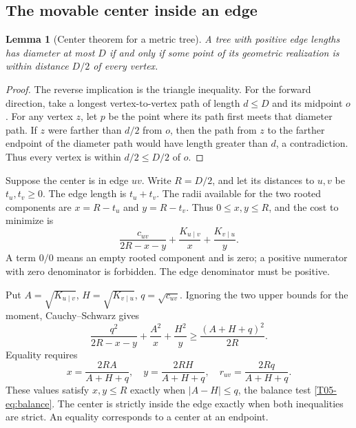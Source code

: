 \documentclass[11pt,a4paper]{article}
\newtheorem{lemma}[theorem]{Lemma}
\theoremstyle{definition}\newtheorem{definition}[theorem]{Definition}
\theoremstyle{remark}\newtheorem{remark}[theorem]{Remark}
\numberwithin{equation}{section}
\begin{document}
\subsection{The movable center inside an edge}\label{T05-sec-3}
\begin{lemma}[Center theorem for a metric tree]\label{T05-lem:center}
A tree with positive edge lengths has diameter at most $D$ if and only if some point of its geometric realization is within distance $D/2$ of every vertex.
\end{lemma}
\begin{proof}
The reverse implication is the triangle inequality. For the forward direction, take a longest vertex-to-vertex path of length $d\le D$ and its midpoint $o$. For any vertex $z$, let $p$ be the point where its path first meets that diameter path. If $z$ were farther than $d/2$ from $o$, then the path from $z$ to the farther endpoint of the diameter path would have length greater than $d$, a contradiction. Thus every vertex is within $d/2\le D/2$ of $o$.
\end{proof}
Suppose the center is in edge $uv$. Write $R=D/2$, and let its distances to $u,v$ be $t_u,t_v\ge0$. The edge length is $t_u+t_v$. The radii available for the two rooted components are $x=R-t_u$ and $y=R-t_v$. Thus $0\le x,y\le R$, and the cost to minimize is
\begin{equation}\label{T05-eq:edgecost}
 \frac{c_{uv}}{2R-x-y}+\frac{K_{u\mid v}}x+\frac{K_{v\mid u}}y.
\end{equation}
A term $0/0$ means an empty rooted component and is zero; a positive numerator with zero denominator is forbidden. The edge denominator must be positive.

Put $A=\sqrt{K_{u\mid v}}$, $H=\sqrt{K_{v\mid u}}$, $q=\sqrt{c_{uv}}$. Ignoring the two upper bounds for the moment, Cauchy--Schwarz gives
\begin{equation}\label{T05-eq:edgeformula}
 \frac{q^2}{2R-x-y}+\frac{A^2}x+\frac{H^2}y
 \ge\frac{(A+H+q)^2}{2R}.
\end{equation}
Equality requires
\begin{equation}\label{T05-eq:edgex}
 x=\frac{2RA}{A+H+q},\quad
 y=\frac{2RH}{A+H+q},\quad
 r_{uv}=\frac{2Rq}{A+H+q}.
\end{equation}
These values satisfy $x,y\le R$ exactly when $|A-H|\le q$, the balance test \eqref{T05-eq:balance}. The center is strictly inside the edge exactly when both inequalities are strict. An equality corresponds to a center at an endpoint.
\end{document}
